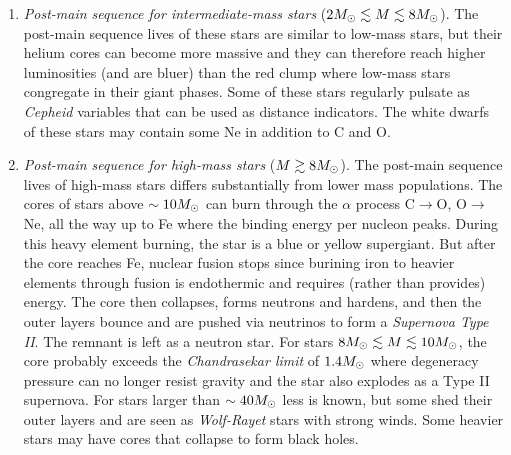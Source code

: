 \documentclass[12pt]{article}
\begin{document}
\begin{enumerate}
\item {\it Post-main sequence for intermediate-mass stars} ($2M_{\odot}\lesssim M\lesssim 8M_{\odot}$).
The post-main sequence lives of these stars are similar to low-mass stars, but their helium
cores can become more massive and they can therefore reach higher luminosities (and are bluer) 
than the red clump where low-mass stars congregate in their giant phases. Some of these stars
regularly pulsate as {\it Cepheid} variables that can be used as distance indicators. The
white dwarfs of these stars may contain some Ne in addition to C and O.

\item {\it Post-main sequence for high-mass stars} ($M\gtrsim 8M_{\odot}$).
The post-main sequence lives of high-mass stars differs substantially from lower mass
populations. The cores of stars above $\sim10M_{\odot}$ can burn through the $\alpha$ process C$\to$O,
O$\to$Ne, all the way up to Fe where the binding energy per nucleon peaks. During this heavy element
burning, the star is a blue or yellow supergiant. But after the core reaches Fe,
nuclear fusion stops since burining iron to heavier elements through fusion is endothermic
and requires (rather than provides) energy. The core then collapses, forms neutrons and hardens,
and then the outer layers bounce and are pushed via neutrinos to form a {\it Supernova Type II}.
The remnant is left as a neutron star. For stars $8M_{\odot} \lesssim M \lesssim10M_{\odot}$, the core probably
exceeds the {\it Chandrasekar limit} of $1.4M_{\odot}$ where degeneracy pressure can no longer resist gravity
and the star also explodes as a Type II supernova. For stars larger than $\sim40M_{\odot}$ less is 
known, but some shed their outer layers and are seen as {\it Wolf-Rayet} stars with strong winds. Some
heavier stars may have cores that collapse to form black holes.

\end{enumerate}
\end{document}
